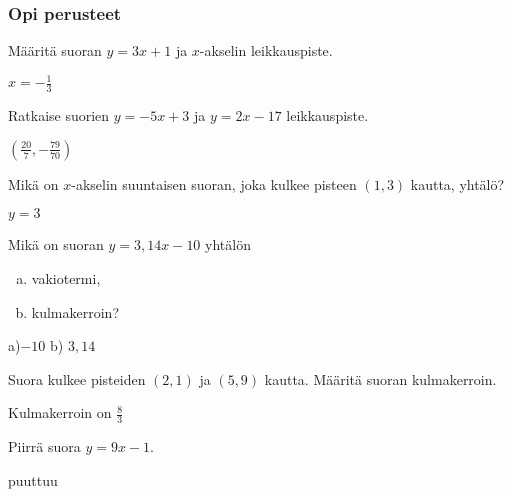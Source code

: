 \begin{tehtavasivu}

\subsubsection*{Opi perusteet}

\begin{tehtava}
Määritä suoran $y=3x+1$ ja $x$-akselin leikkauspiste.
\begin{vastaus}
$x=-\frac{1}{3}$
\end{vastaus}
\end{tehtava}

\begin{tehtava}
Ratkaise suorien $y=-5x+3$ ja $y=2x-17$ leikkauspiste.
\begin{vastaus}
$(\frac{20}{7}, -\frac{79}{70})$
\end{vastaus}
\end{tehtava}

\begin{tehtava}
Mikä on $x$-akselin suuntaisen suoran, joka kulkee pisteen $(1, 3)$ kautta, yhtälö?
\begin{vastaus}
$y=3$
\end{vastaus}
\end{tehtava}

\begin{tehtava}
Mikä on suoran $y=3,14x-10$ yhtälön
\begin{enumerate}[a)]
\item vakiotermi,
\item kulmakerroin?
\end{enumerate}
\begin{vastaus}
a)$-10$ b) $3,14$
\end{vastaus}
\end{tehtava}

\begin{tehtava}
Suora kulkee pisteiden $(2, 1)$ ja $(5, 9)$ kautta. Määritä suoran kulmakerroin.
\begin{vastaus}
Kulmakerroin on $\frac{8}{3}$
\end{vastaus}
\end{tehtava}

\begin{tehtava}
Piirrä suora $y=9x-1$.
\begin{vastaus}
puuttuu
\end{vastaus}
\end{tehtava}


\end{tehtavasivu}
